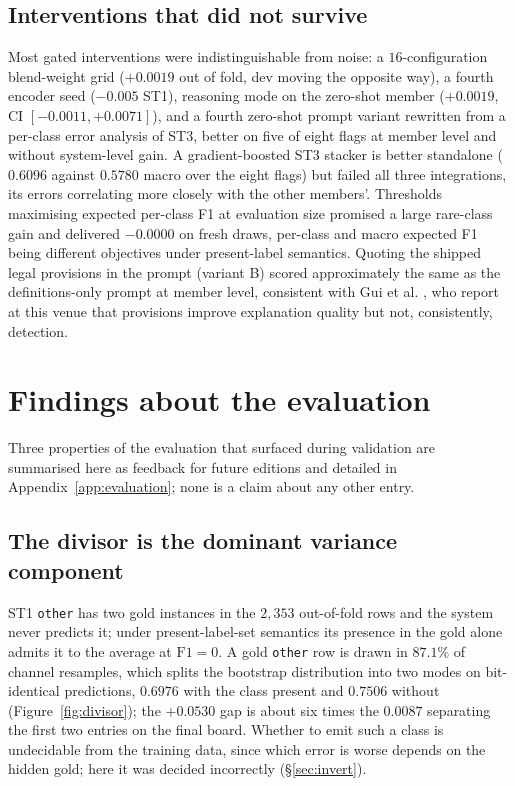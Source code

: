 \documentclass[11pt]{article}
\newcommand{\lab}[1]{\texttt{\small #1}}
\begin{document}
\subsection{Interventions that did not survive}
\label{sec:failed}

Most gated interventions were indistinguishable from noise: a $16$-configuration blend-weight
grid ($+0.0019$ out of fold, dev moving the opposite way), a
fourth encoder seed ($-0.005$ ST1), reasoning mode on the zero-shot member ($+0.0019$, CI
$[-0.0011,+0.0071]$), and a fourth zero-shot prompt variant rewritten from a per-class error
analysis of ST3, better on five of eight flags at member level and without system-level gain.
A gradient-boosted ST3 stacker is better standalone ($0.6096$ against $0.5780$ macro over the
eight flags) but failed all three integrations, its errors correlating more closely with the
other members'. Thresholds maximising expected per-class F1 at evaluation size promised a large
rare-class gain and delivered $-0.0000$ on fresh draws, per-class and macro expected F1 being
different objectives under present-label semantics. Quoting the shipped legal provisions in the
prompt (variant B) scored approximately the same as the definitions-only prompt at member
level, consistent with Gui et al. , who report at this venue
that provisions improve explanation quality but not, consistently, detection.

\section{Findings about the evaluation}
\label{sec:evaluation}

Three properties of the evaluation that surfaced during validation are summarised here as
feedback for future editions and detailed in Appendix~\ref{app:evaluation}; none is a claim
about any other entry.

\subsection{The divisor is the dominant variance component}
\label{sec:divisor}

ST1 \lab{other} has two gold instances in the $2{,}353$ out-of-fold rows and the system never
predicts it; under present-label-set semantics its presence in the gold alone admits it to the
average at $\mathrm{F1}=0$. A gold \lab{other} row is drawn in $87.1\%$ of channel resamples,
which splits the bootstrap distribution into two modes on bit-identical predictions, $0.6976$
with the class present and $0.7506$ without (Figure~\ref{fig:divisor}); the $+0.0530$ gap is
about six times the $0.0087$ separating the first two entries on the final board. Whether to
emit such a class is undecidable from the training data, since which error is worse depends on
the hidden gold; here it was decided incorrectly (\S\ref{sec:invert}).
\end{document}
